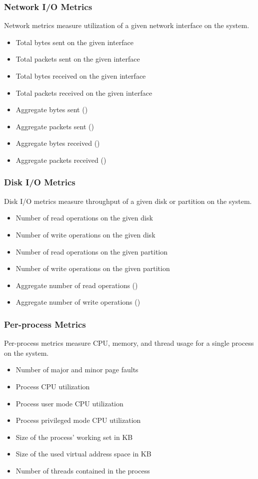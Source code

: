 \subsubsection{Network I/O Metrics}
Network metrics measure utilization of a given network interface on the system.
\begin{itemize}
\item Total bytes sent on the given interface
\item Total packets sent on the given interface
\item Total bytes received on the given interface
\item Total packets received on the given interface
\item Aggregate bytes sent (\dcamp)
\item Aggregate packets sent (\dcamp)
\item Aggregate bytes received (\dcamp)
\item Aggregate packets received (\dcamp)
\end{itemize}

\subsubsection{Disk I/O Metrics}
Disk I/O metrics measure throughput of a given disk or partition on the system.
\begin{itemize}
\item Number of read operations on the given disk
\item Number of write operations on the given disk
\item Number of read operations on the given partition
\item Number of write operations on the given partition
\item Aggregate number of read operations (\dcamp)
\item Aggregate number of write operations (\dcamp)
\end{itemize}

\subsubsection{Per-process Metrics}
Per-process metrics measure CPU, memory, and thread usage for a single process on the system.
\begin{itemize}
\item Number of major and minor page faults
\item Process CPU utilization
\item Process user mode CPU utilization
\item Process privileged mode CPU utilization
\item Size of the process' working set in KB
\item Size of the used virtual address space in KB
\item Number of threads contained in the process
\end{itemize}

